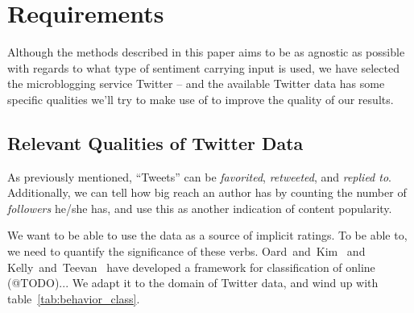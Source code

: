 
\chapter{Requirements} %

\label{Chapter3} %


% 
% 

Although the methods described in this paper aims to be as agnostic as possible with regards to what type of sentiment carrying input is used, we have selected the microblogging service Twitter -- and the available Twitter data has some specific qualities we'll try to make use of to improve the quality of our results.

\section{Relevant Qualities of Twitter Data} %
\label{sec:relevant_qualities_of_twitter_data}

As previously mentioned, ``Tweets'' can be \emph{favorited}, \emph{retweeted}, and \emph{replied to}.
Additionally, we can tell how big reach an author has by counting the number of \emph{followers} he/she has, and use this as another indication of content popularity.

We want to be able to use the data as a source of implicit ratings. To be able to, we need to quantify the significance of these verbs.
Oard~and~Kim~\cite{Oard98implicitfeedback,Oard01modelinginformation} and Kelly~and~Teevan~\cite{Kelly03implicitfeedback} have developed a framework for classification of online (@TODO)...
We adapt it to the domain of Twitter data, and wind up with table~\ref{tab:behavior_class}.

